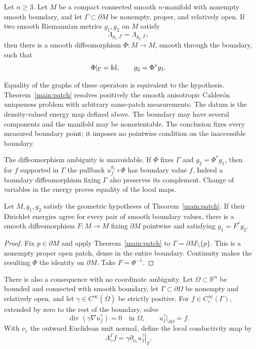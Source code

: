 \begin{theorem}
\label{main:patch}
Let $n\ge3$. Let $M$ be a compact connected smooth $n$-manifold with
nonempty smooth boundary, and let $\Gamma\subset\partial M$ be nonempty,
proper, and relatively open. If two smooth Riemannian metrics $g_1,g_2$
on $M$ satisfy
\[
 \Lambda_{g_1,\Gamma}=\Lambda_{g_2,\Gamma},
\]
then there is a smooth diffeomorphism $\Phi:M\to M$, smooth through
the boundary, such that
\[
 \Phi|_\Gamma=\mathrm{Id},\qquad g_2=\Phi^*g_1.
\]
\end{theorem}

Equality of the graphs of these operators is equivalent to the hypothesis.
Theorem~\ref{main:patch} resolves positively the smooth anisotropic
Calder\'on uniqueness problem with arbitrary same-patch measurements.
The datum is the density-valued energy map defined above.
The boundary may have several components and the manifold may be
nonorientable. The conclusion fixes every measured boundary point;
it imposes no pointwise condition on the inaccessible boundary.

The diffeomorphism ambiguity is unavoidable. If $\Phi$ fixes $\Gamma$
and $g_2=\Phi^*g_1$, then for $f$ supported in $\Gamma$ the pullback
$u_f^{g_1}\circ\Phi$ has boundary value $f$. Indeed a boundary
diffeomorphism fixing $\Gamma$ also preserves its complement.
Change of variables in the energy proves equality of the local maps.

\begin{corollary}\label{main:full}
Let $M,g_1,g_2$ satisfy the geometric hypotheses of
Theorem~\ref{main:patch}. If their Dirichlet energies agree for every
pair of smooth boundary values, there is a smooth diffeomorphism
$F:M\to M$ fixing $\partial M$ pointwise and satisfying $g_1=F^*g_2$.
\end{corollary}

\begin{proof}
Fix $p\in\partial M$ and apply Theorem~\ref{main:patch} to
$\Gamma=\partial M\setminus\{p\}$. This is a nonempty proper open
patch, dense in the entire boundary. Continuity makes the resulting
$\Phi$ the identity on $\partial M$. Take $F=\Phi^{-1}$.
\end{proof}

There is also a consequence with no coordinate ambiguity.  Let
$\Omega\subset\mathbb R^n$ be bounded and connected with smooth
boundary, let $\Gamma\subset\partial\Omega$ be nonempty and relatively
open, and let $\gamma\in C^\infty(\overline\Omega)$ be strictly
positive.  For $f\in C_c^\infty(\Gamma)$, extended by zero to the
rest of the boundary, solve
\[
 \operatorname{div}(\gamma\nabla u_f^\gamma)=0\quad\text{in }\Omega,
 \qquad u_f^\gamma|_{\partial\Omega}=f.
\]
With $\nu_e$ the outward Euclidean unit normal, define the local
conductivity map by
\[
 \Lambda_\gamma^\Gamma f
       =\left.\gamma\partial_{\nu_e}u_f^\gamma\right|_\Gamma.
\]

